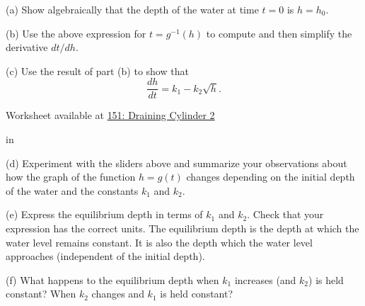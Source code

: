 \documentclass{ximera}
\newcommand{\pskip}{\vskip 0.1 in}
\begin{document}
\begin{question}
(a) Show algebraically that the depth of the water at time $t=0$ is $h=h_0$.

(b) Use the above expression for $t=g^{-1}(h)$ to compute and then simplify the derivative $dt/dh$. 

(c) Use the result of part (b) to show that 
\[
   \frac{dh}{dt} =  k_1 - k_2 \sqrt{h} .
\]

\begin{onlineOnly}
    \begin{center}
\end{center}
\end{onlineOnly}

Worksheet available at \href{https://www.desmos.com/calculator/c78kv7wifv}{151: Draining Cylinder 2}

\pskip

(d) Experiment with the sliders above and summarize your observations about how the graph of the function $h=g(t)$ changes depending on the initial depth of the water and the constants $k_1$ and $k_2$. 

(e) Express the equilibrium depth in terms of $k_1$ and $k_2$. Check that your expression has the correct units. The equilibrium depth is the depth at which the water level remains constant. It is also the depth which the water level approaches (independent of the initial depth).

(f) What happens to the equilibrium depth when $k_1$ increases (and $k_2$) is held constant? When $k_2$ changes and $k_1$ is held constant?

\end{question}
\end{document}
